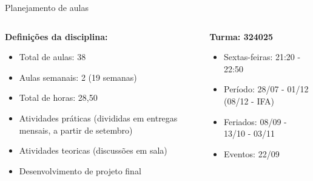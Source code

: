 \documentclass{beamer}
\begin{document}
\begin{frame}[fragile]{Planejamento de aulas}
      \begin{columns}
            \begin{column}{0.5\textwidth}
                  \textbf{Definições da disciplina:}
                  \begin{itemize}
                        \item Total de aulas: 38 
                        \item Aulas semanais: 2 (19 semanas)
                        \item Total de horas: 28,50
                        \item Atividades práticas (divididas em entregas mensais, a partir de setembro)
                        \item Atividades teoricas (discussões em sala)
                        \item Desenvolvimento de projeto final
      
                  \end{itemize}


            \end{column}
            \begin{column}{0.5\textwidth}
                  \textbf{Turma: 324025}
                  \begin{itemize}
                        \item Sextas-feiras: 21:20 - 22:50
                        \item Período: 28/07 - 01/12 (08/12 - IFA)
                        \item Feriados: 08/09 - 13/10 - 03/11
                        \item Eventos: 22/09
                  \end{itemize}
                  
            \end{column}
      \end{columns}
\end{frame}




%
%
%            
%        
\end{document}
